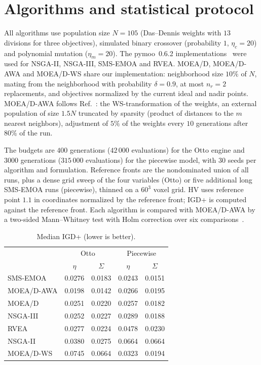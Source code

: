 \documentclass[pre,twocolumn,superscriptaddress,nofootinbib,longbibliography]{revtex4-2}
\begin{document}
\appendix

\section{Algorithms and statistical protocol}
\label{app:protocol}

All algorithms use population size $N = 105$ (Das--Dennis weights with $13$ divisions for three
objectives), simulated binary crossover (probability $1$, $\eta_c = 20$) and polynomial mutation
($\eta_m = 20$). The pymoo~0.6.2 implementations~\cite{Blank2020} were used for NSGA-II, NSGA-III,
SMS-EMOA and RVEA. MOEA/D, MOEA/D-AWA and MOEA/D-WS share our implementation: neighborhood size
$10\%$ of $N$, mating from the neighborhood with probability $\delta = 0.9$, at most $n_r = 2$
replacements, and objectives normalized by the current ideal and nadir points. MOEA/D-AWA follows
Ref.~\cite{Qi2014}: the WS-transformation of the weights, an external population of size $1.5N$
truncated by sparsity (product of distances to the $m$ nearest neighbors), adjustment of $5\%$ of
the weights every $10$ generations after $80\%$ of the run.

The budgets are $400$ generations ($42\,000$ evaluations) for the Otto engine and $3000$
generations ($315\,000$ evaluations) for the piecewise model, with $30$ seeds per algorithm and
formulation. Reference fronts are the nondominated union of all runs, plus a dense grid sweep of
the four variables (Otto) or five additional long SMS-EMOA runs (piecewise), thinned on a
$60^3$ voxel grid. HV uses reference point $1.1$ in coordinates normalized by the reference
front; IGD+ is computed against the reference front. Each algorithm is compared with MOEA/D-AWA
by a two-sided Mann--Whitney test with Holm correction over six comparisons~\cite{Holm1979}.

\begin{table}[h]
\caption{Median IGD+ (lower is better).}
\setlength{\tabcolsep}{3pt}
\label{tab:igd}
\begin{ruledtabular}
\scriptsize
\begin{tabular}{lcccc}
 & \multicolumn{2}{c}{Otto} & \multicolumn{2}{c}{Piecewise} \\
 & $\eta$ & $\Sigma$ & $\eta$ & $\Sigma$ \\
\hline
SMS-EMOA & 0.0276 & 0.0183 & 0.0243 & 0.0151 \\
MOEA/D-AWA & 0.0198 & 0.0142 & 0.0266 & 0.0195 \\
MOEA/D & 0.0251 & 0.0220 & 0.0257 & 0.0182 \\
NSGA-III & 0.0252 & 0.0227 & 0.0289 & 0.0188 \\
RVEA & 0.0277 & 0.0224 & 0.0478 & 0.0230 \\
NSGA-II & 0.0380 & 0.0275 & 0.0664 & 0.0664 \\
MOEA/D-WS & 0.0745 & 0.0664 & 0.0323 & 0.0194
\end{tabular}
\end{ruledtabular}
\end{table}


\end{document}
